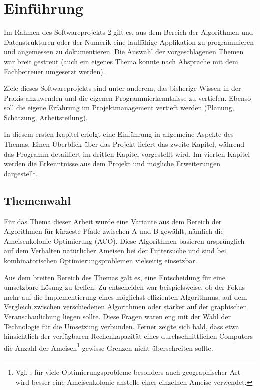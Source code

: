 

\chapter{Einführung}

Im Rahmen des Softwareprojekts 2 gilt es, aus dem Bereich der Algorithmen und
Datenstrukturen oder der Numerik eine lauffähige Applikation zu programmieren
und angemessen zu dokumentieren. Die Auswahl der vorgeschlagenen Themen war
breit gestreut (auch ein eigenes Thema konnte nach Absprache mit dem
Fachbetreuer umgesetzt werden).

Ziele dieses Softwareprojekts sind unter anderem, das bisherige Wissen in der
Praxis anzuwenden und die eigenen Programmierkenntnisse zu vertiefen. Ebenso
soll die eigene Erfahrung im Projektmanagement vertieft werden (Planung, 
Schätzung, Arbeitsteilung).

In diesem ersten Kapitel erfolgt eine Einführung in allgemeine Aspekte des
Themas. Einen Überblick über das Projekt liefert das zweite Kapitel, während das
Programm detailliert im dritten Kapitel vorgestellt wird. Im vierten Kapitel
werden die Erkenntnisse aus dem Projekt und mögliche Erweiterungen dargestellt.



\section{Themenwahl}

Für das Thema dieser Arbeit wurde eine Variante aus dem Bereich der Algorithmen
für kürzeste Pfade zwischen A und B gewählt, nämlich die
Ameisenkolonie-Optimierung (ACO). Diese Algorithmen basieren ursprünglich auf
dem Verhalten natürlicher Ameisen bei der Futtersuche und sind bei
kombinatorischen Optimierungsproblemen vielseitig einsetzbar.

Aus dem breiten Bereich des Themas galt es, eine Entscheidung für eine
umsetzbare Lösung zu treffen. Zu entscheiden war beispielsweise, ob der Fokus
mehr auf die Implementierung eines möglichst effizienten Algorithmus, auf dem
Vergleich zwischen verschiedenen Algorithmen oder stärker auf der graphischen
Veranschaulichung liegen sollte. Diese Fragen waren eng mit der Wahl der
Technologie für die Umsetzung verbunden. Ferner zeigte sich bald, dass
etwa hinsichtlich der verfügbaren Rechenkapazität eines durchschnittlichen
Computers die Anzahl der Ameisen\footnote{Vgl. \citet*[S. 217]{ds-ant}; für
viele Optimierungsprobleme besonders auch geographischer Art wird besser eine
Ameisenkolonie anstelle einer einzelnen Ameise verwendet.} gewisse
Grenzen nicht überschreiten sollte.


